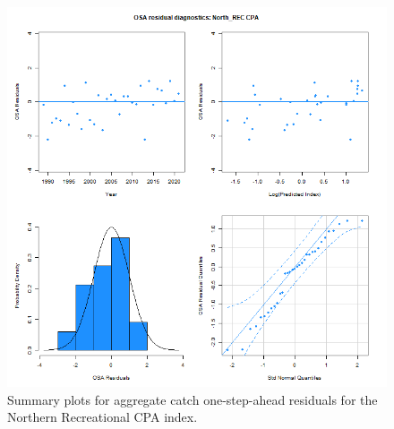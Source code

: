 \documentclass[
]{article}
\begin{document}
\begin{figure}

{\centering \includegraphics[width=1\linewidth]{../2023.RT.Runs/Run34/plots_png/diagnostics/OSA_resid_catch_4panel_North_REC_CPA} 

}

\caption{Summary plots for aggregate catch one-step-ahead residuals for the Northern Recreational CPA index.}\label{fig:osa-North-reccpa-catch-summ}
\end{figure}
\end{document}
